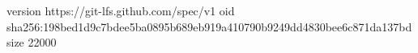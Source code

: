 version https://git-lfs.github.com/spec/v1
oid sha256:198bed1d9c7bdee5ba0895b689eb919a410790b9249dd4830bee6c871da137bd
size 22000
